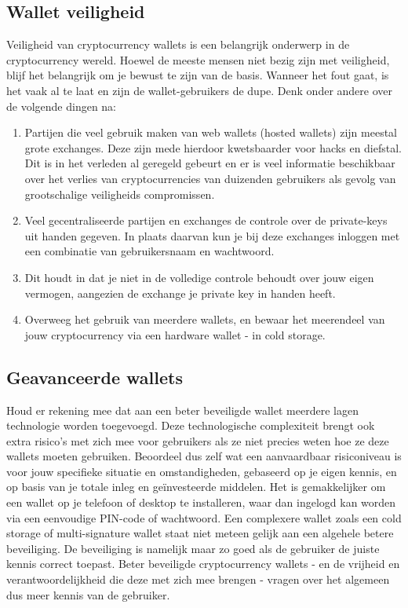 \subsection*{Wallet veiligheid}

Veiligheid van cryptocurrency wallets is een belangrijk onderwerp in de cryptocurrency wereld. Hoewel de meeste mensen niet bezig zijn met veiligheid, blijf het belangrijk om je bewust te zijn van de basis. Wanneer het fout gaat, is het vaak al te laat en zijn de wallet-gebruikers de dupe. Denk onder andere over de volgende dingen na: 

\begin{enumerate}[label=(\alph*)]
  \setlength\itemsep{0em}
    \item Partijen die veel gebruik maken van web wallets (hosted wallets) zijn meestal grote exchanges. Deze zijn mede hierdoor kwetsbaarder voor hacks en diefstal. Dit is in het verleden al geregeld gebeurt en er is veel informatie beschikbaar over het verlies van cryptocurrencies van duizenden gebruikers als gevolg van grootschalige veiligheids compromissen. 
    \item Veel gecentraliseerde partijen en exchanges de controle over de private-keys uit handen gegeven. In plaats daarvan kun je bij deze exchanges inloggen met een combinatie van gebruikersnaam en wachtwoord.
    \item Dit houdt in dat je niet in de volledige controle behoudt over jouw eigen vermogen, aangezien de exchange je private key in handen heeft.
    \item Overweeg het gebruik van meerdere wallets, en bewaar het meerendeel van jouw cryptocurrency via een hardware wallet - in cold storage.
\end{enumerate}

\medskip

\subsection*{Geavanceerde wallets}

Houd er rekening mee dat aan een beter beveiligde wallet meerdere lagen technologie worden toegevoegd. Deze technologische complexiteit brengt ook extra risico's met zich mee voor gebruikers als ze niet precies weten hoe ze deze wallets moeten gebruiken. Beoordeel dus zelf wat een aanvaardbaar risiconiveau is voor jouw specifieke situatie en omstandigheden, gebaseerd op je eigen kennis, en op basis van je totale inleg en ge{\"i}nvesteerde middelen.
Het is gemakkelijker om een wallet op je telefoon of desktop te installeren, waar dan ingelogd kan worden via een eenvoudige PIN-code of wachtwoord. Een complexere wallet zoals een cold storage of multi-signature wallet staat niet meteen gelijk aan een algehele betere beveiliging. De beveiliging is namelijk maar zo goed als de gebruiker de juiste kennis correct toepast. Beter beveiligde cryptocurrency wallets - en de vrijheid en verantwoordelijkheid die deze met zich mee brengen - vragen over het algemeen dus meer kennis van de gebruiker. 






